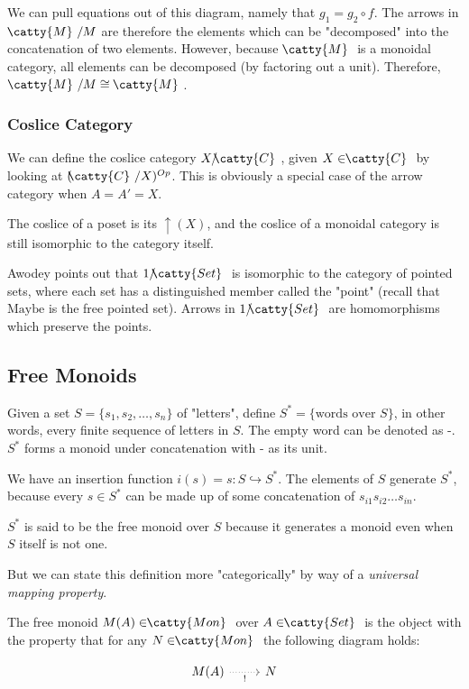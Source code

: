 \documentclass[]{article}
\newcommand{\cdrn}[1]{\arrow[swap,dotted]{r}{#1}}
\newcommand{\cat}[1]{\ensuremath{\!\! \catty{#1} \,\,}}
\begin{document}
We can pull equations out of this diagram, namely that $g_1 = g_2 \circ f$. The
arrows in $\;\cat{M}/M$ are therefore the elements which can be "decomposed"
into the concatenation of two elements. However, because $\;\cat{M}$ is a
monoidal category, all elements can be decomposed (by factoring out a unit).
Therefore, $\;\cat{M}/M \cong\;\cat{M}$.

\subsubsection{Coslice Category}

We can define the coslice category $X/\cat{C}$, given $X \in \cat{C}$ by looking
at $(\cat{C}/X)^{Op}$. This is obviously a special case of the arrow category
when $A = A' = X$.

The coslice of a poset is its $\uparrow\!(X)$, and the coslice of a monoidal
category is still isomorphic to the category itself.

Awodey points out that $1/\cat{Set}$ is isomorphic to the category of pointed
sets, where each set has a distinguished member called the "point" (recall that
$\text{Maybe}$ is the free pointed set). Arrows in $1/\cat{Set}$ are
homomorphisms which preserve the points.

\subsection{Free Monoids}

Given a set $S = \{s_1, s_2, \dots, s_n \}$ of "letters", define $S^* =
\{\text{words over } S\}$, in other words, every finite sequence of letters in
$S$. The empty word can be denoted as -. $S^*$ forms a monoid under
concatenation with - as its unit.

We have an insertion function $i(s) = s : S \hookrightarrow S^*$. The elements
of $S$ generate $S^*$, because every $s \in S^*$ can be made up of some
concatenation of $s_{i1}s_{i2}\dots s_{in}$.

$S^*$ is said to be the free monoid over $S$ because it generates a monoid even
when $S$ itself is not one.

But we can state this definition more "categorically" by way of a
\textit{universal mapping property}.

The free monoid $M(A) \in \cat{Mon}$ over $A \in \cat{Set}$ is the object with
the property that for any $N \in \cat{Mon}$ the following diagram holds:

$$\begin{tikzcd}
  M(A) \cdrn{!} & N
\end{tikzcd}$$
\end{document}
